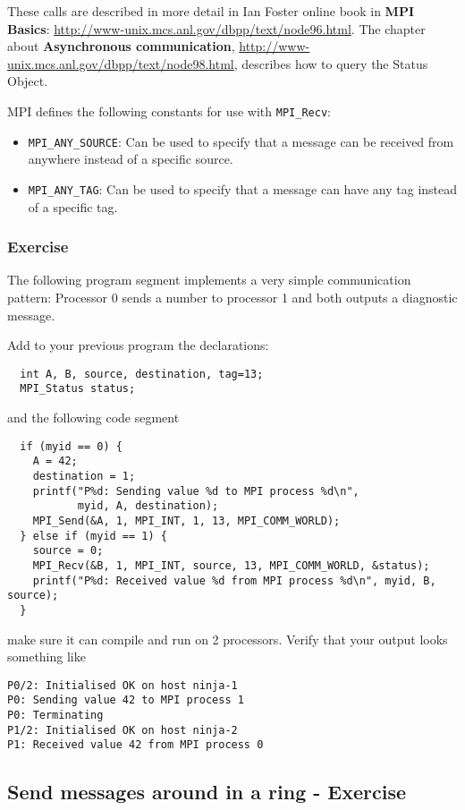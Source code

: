 \documentclass[12pt]{article}
\begin{document}
\noindent These calls are described in more detail in Ian Foster online book
in \textbf{MPI Basics}: 
\url{http://www-unix.mcs.anl.gov/dbpp/text/node96.html}.
The chapter about \textbf{Asynchronous communication},
\url{http://www-unix.mcs.anl.gov/dbpp/text/node98.html}, describes how 
to query the Status Object.

MPI defines the following constants for use with \texttt{MPI\_Recv}:
\begin{itemize} 
  \item \texttt{MPI\_ANY\_SOURCE}: Can be used to specify that a message 
  can be received from anywhere instead of a specific source. 
  \item \texttt{MPI\_ANY\_TAG}: Can be used to specify that a message 
  can have any tag instead of a specific tag.
\end{itemize}   

\subsubsection*{Exercise}
The following program segment implements a very simple
communication pattern: Processor 0 sends a number to processor 1 and 
both outputs a diagnostic message.

Add to your previous program the declarations:
\begin{verbatim}
  int A, B, source, destination, tag=13;
  MPI_Status status;
\end{verbatim}
and the following code segment
\begin{verbatim} 
  if (myid == 0) {
    A = 42;
    destination = 1;
    printf("P%d: Sending value %d to MPI process %d\n", 
           myid, A, destination);   
    MPI_Send(&A, 1, MPI_INT, 1, 13, MPI_COMM_WORLD);
  } else if (myid == 1) {
    source = 0;
    MPI_Recv(&B, 1, MPI_INT, source, 13, MPI_COMM_WORLD, &status);    
    printf("P%d: Received value %d from MPI process %d\n", myid, B, source);
  }
\end{verbatim}
make sure it can compile and run on 2 processors.
Verify that your output looks something like  
\begin{verbatim}
P0/2: Initialised OK on host ninja-1
P0: Sending value 42 to MPI process 1
P0: Terminating
P1/2: Initialised OK on host ninja-2
P1: Received value 42 from MPI process 0
\end{verbatim}



\subsection*{Send messages around in a ring - Exercise}
\end{document}
